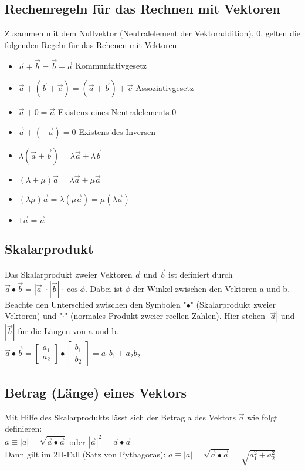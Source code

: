 \documentclass[../main.tex]{subfiles}
\begin{document}
\subsection{Rechenregeln für das Rechnen mit Vektoren}
Zusammen mit dem Nullvektor (Neutralelement der Vektoraddition), 0, gelten die folgenden Regeln für das Rehcnen mit Vektoren: 
\begin{itemize}
    \item $\vec{a}+\vec{b}=\vec{b}+\vec{a}$ Kommuntativgesetz 
    \item $\vec{a}+(\vec{b}+\vec{c})=(\vec{a}+\vec{b})+\vec{c}$ Assoziativgesetz 
    \item $\vec{a}+0=\vec{a}$ Existenz eines Neutralelements 0 
    \item $\vec{a}+(-\vec{a})=0$ Existens des Inversen 
    \item $\lambda(\vec{a}+\vec{b})=\lambda\vec{a}+\lambda\vec{b}$ 
    \item $(\lambda+\mu)\vec{a}=\lambda\vec{a}+\mu\vec{a}$ 
    \item $(\lambda\mu)\vec{a}=\lambda(\mu\vec{a})=\mu(\lambda\vec{a})$ 
    \item $1\vec{a}=\vec{a}$
\end{itemize}

\subsection{Skalarprodukt}
Das Skalarprodukt zweier Vektoren $\vec{a}$ und $\vec{b}$ ist definiert durch 
$\vec{a}\bullet\vec{b}=|\vec{a}|\cdot|\vec{b}|\cdot\cos\phi$. Dabei ist $\phi$ der Winkel 
zwischen den Vektoren a und b. Beachte den Unterschied zwischen den Symbolen "$\bullet$" 
(Skalarprodukt zweier Vektoren) und "$\cdot$" (normales Produkt zweier reellen Zahlen).
Hier stehen $|\vec{a}|$ und $|\vec{b}|$ für die Längen von a und b. \\ [7pt]
$\vec{a}\bullet\vec{b} =
\begin{bmatrix}a_1 \\a_2 \end{bmatrix} \bullet
\begin{bmatrix}b_1 \\b_2 \end{bmatrix} =
a_1b_1+a_2b_2$

\subsection{Betrag (Länge) eines Vektors}
Mit Hilfe des Skalarprodukts lässt sich der Betrag a des Vektors $\vec{a}$ wie folgt definieren: \\ [7pt]
$a\equiv|a|=\sqrt{\vec{a}\bullet\vec{a}}$ oder $|\vec{a}|^2=\vec{a}\bullet\vec{a}$ \\ [7pt]
Dann gilt im 2D-Fall (Satz von Pythagoras): $a\equiv|a|=\sqrt{\vec{a}\bullet\vec{a}}=\sqrt{a_1^2+a_2^2}$
\end{document}
